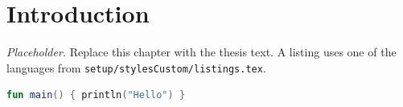 \sectionInit
\section{Introduction}

\textit{Placeholder.} Replace this chapter with the thesis text. A listing uses one of the languages from \texttt{setup/stylesCustom/listings.tex}.

\begin{lstlisting}[language=Kotlin, caption={Placeholder listing}]
fun main() { println("Hello") }
\end{lstlisting}
